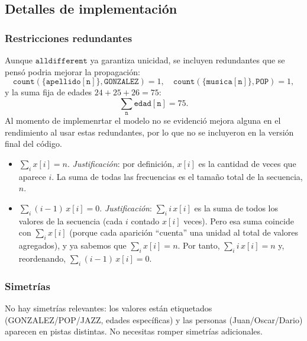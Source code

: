 
\subsection{Detalles de implementación}\label{sec:04-acertijo-logico-impl}
\subsubsection*{Restricciones redundantes}
Aunque $\texttt{alldifferent}$ ya garantiza unicidad, se incluyen redundantes que se pensó podria mejorar la propagación:
\[
\texttt{count}(\{\texttt{apellido}[\texttt{n}]\},\texttt{GONZALEZ})=1,\quad
\texttt{count}(\{\texttt{musica}[\texttt{n}]\},\texttt{POP})=1,
\]
y la suma fija de edades $24+25+26=75$:
\[
\sum_{\texttt{n}} \texttt{edad}[\texttt{n}] = 75.
\]
Al momento de implemenrtar el modelo no se evidenció mejora alguna en el rendimiento al usar estas redundantes, por lo que no se incluyeron en la versión final del código.

\begin{itemize}
  \item \(\displaystyle \sum_i x[i] = n\). \textit{Justificación}: por definición, \(x[i]\) es la cantidad de veces que aparece \(i\). La suma de todas las frecuencias es el tamaño total de la secuencia, \(n\).
  \item \(\displaystyle \sum_i (i-1)\,x[i] = 0\). \textit{Justificación}: \(\sum_i i\,x[i]\) es la suma de todos los valores de la secuencia (cada \(i\) contado \(x[i]\) veces). Pero esa suma coincide con \(\sum_i x[i]\) (porque cada aparición “cuenta” una unidad al total de valores agregados), y ya sabemos que \(\sum_i x[i]=n\). Por tanto, \(\sum_i i\,x[i]=n\) y, reordenando, \(\sum_i (i-1)\,x[i]=0\).
\end{itemize}

\subsubsection*{Simetrías}
No hay simetrías relevantes: los valores están etiquetados (GONZALEZ/POP/JAZZ, edades específicas) y las personas (Juan/Oscar/Dario) aparecen en pistas distintas. No necesitas romper simetrías adicionales.
